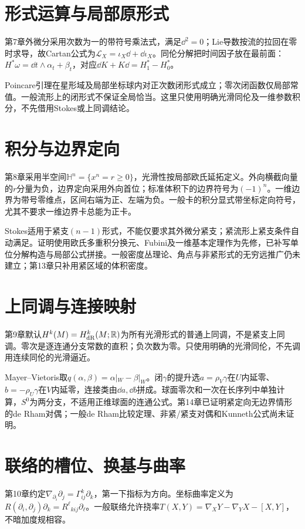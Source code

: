 \section{形式运算与局部原形式}
第7章外微分采用次数为一的带符号乘法式，满足$\dd^2=0$；Lie导数按流的拉回在零时求导，故Cartan公式为$\mathcal L_X=\iota_X\dd+\dd\iota_X$。同伦分解把时间因子放在最前面：$H^*\omega=\dd t\wedge\alpha_t+\beta_t$，对应$\dd K+K\dd=H_1^*-H_0^*$。

Poincare引理在星形域及局部坐标球内对正次数闭形式成立；零次闭函数仅局部常值。一般流形上的闭形式不保证全局恰当。这里只使用明确光滑同伦及一维参数积分，不先借用Stokes或上同调结论。

\section{积分与边界定向}
第8章采用半空间$\mathbb H^n=\{x^n=r\geq0\}$，光滑性按局部欧氏延拓定义。外向横截向量的$r$分量为负，边界定向采用外向首位；标准体积下的边界符号为$(-1)^n$。一维边界为带号零维点，区间右端为正、左端为负。一般卡的积分显式带坐标定向符号，尤其不要求一维边界卡总能为正卡。

Stokes适用于紧支$(n-1)$形式，不能仅要求其外微分紧支；紧流形上紧支条件自动满足。证明使用欧氏多重积分换元、Fubini及一维基本定理作为先修，已补写单位分解构造与局部公式拼接。一般密度丛理论、角点与非紧形式的无穷远推广仍未建立；第13章只补用紧区域的体积密度。

\section{上同调与连接映射}
第9章默认$H^k(M)=H^k_{\mathrm{dR}}(M;\mathbb{R})$为所有光滑形式的普通上同调，不是紧支上同调。零次是逐连通分支常数的直积；负次数为零。只使用明确的光滑同伦，不先调用连续同伦的光滑逼近。

Mayer--Vietoris取$q(\alpha,\beta)=\alpha|_W-\beta|_W$。闭$\gamma$的提升选$a=\rho_V\gamma$在$U$内延零、$b=-\rho_U\gamma$在$V$内延零，连接类由$\dd a,\dd b$拼成。球面零次和一次在长序列中单独计算，$S^0$为两分支，不适用正维球面的连通公式。第14章已证明紧定向无边界情形的de Rham对偶；一般de Rham比较定理、非紧/紧支对偶和Kunneth公式尚未证明。

\section{联络的槽位、换基与曲率}
第10章约定$\nabla_{\partial_i}\partial_j=\Gamma^k_{ij}\partial_k$，第一下指标为方向。坐标曲率定义为$R(\partial_i,\partial_j)\partial_k=R^\ell{}_{kij}\partial_\ell$。一般联络允许挠率$T(X,Y)=\nabla_XY-\nabla_YX-[X,Y]$，不暗加度规相容。

